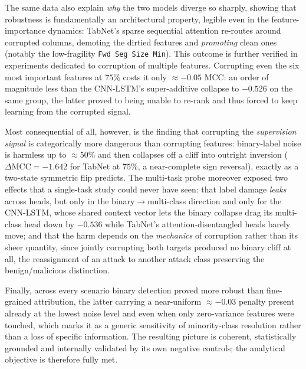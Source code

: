 \documentclass[../main.tex]{subfiles}
\begin{document}
The same data also explain \emph{why} the two models diverge so sharply, showing that robustness is fundamentally an architectural property, legible even in the feature-importance dynamics: TabNet's sparse sequential attention re-routes around corrupted columns, demoting the dirtied features and \emph{promoting} clean ones (notably the low-fragility \texttt{Fwd Seg Size Min}). This outcome is further verified in experiments dedicated to corruption of multiple features. Corrupting even the six most important features at $75\%$ costs it only $\approx -0.05$ MCC: an order of magnitude less than the CNN-LSTM's super-additive collapse to $-0.526$ on the same group, the latter proved to being unable to re-rank and thus forced to keep learning from the corrupted signal. 

Most consequential of all, however, is the finding that corrupting the \emph{supervision signal} is categorically more dangerous than corrupting features: binary-label noise is harmless up to $\approx 50\%$ and then collapses off a cliff into outright inversion ($\Delta\mathrm{MCC}=-1.642$ for TabNet at $75\%$, a near-complete sign reversal), exactly as a two-state symmetric flip predicts. The multi-task probe moreover exposed two effects that a single-task study could never have seen: that label damage \emph{leaks} across heads, but only in the binary$\rightarrow$multi-class direction and only for the CNN-LSTM, whose shared context vector lets the binary collapse drag its multi-class head down by $-0.536$ while TabNet's attention-disentangled heads barely move; and that the harm depends on the \emph{mechanics} of corruption rather than its sheer quantity, since jointly corrupting both targets produced no binary cliff at all, the reassignment of an attack to another attack class preserving the benign/malicious distinction. 

Finally, across every scenario binary detection proved more robust than fine-grained attribution, the latter carrying a near-uniform $\approx -0.03$ penalty present already at the lowest noise level and even when only zero-variance features were touched, which marks it as a generic sensitivity of minority-class resolution rather than a loss of specific information. The resulting picture is coherent, statistically grounded and internally validated by its own negative controls; the analytical objective is therefore fully met.
\end{document}
